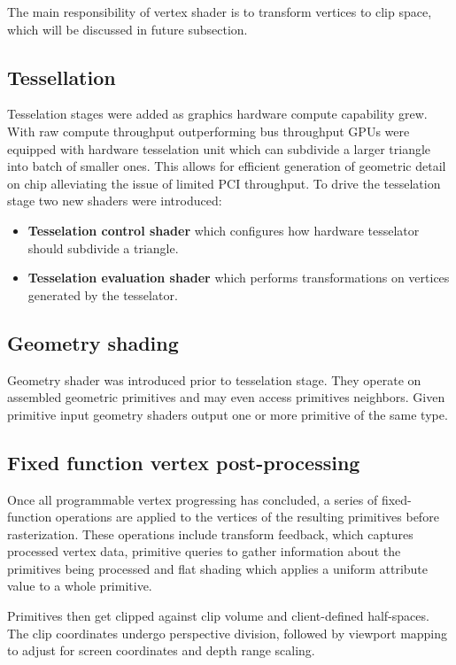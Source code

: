 The main responsibility of vertex shader is to transform vertices to clip space, which will be discussed in future subsection. %

\subsection{Tessellation}

Tesselation stages were added as graphics hardware compute capability grew. With raw compute throughput outperforming bus throughput GPUs were equipped with hardware
tesselation unit which can subdivide a larger triangle into batch of smaller ones. This allows for efficient generation of geometric detail on chip alleviating the 
issue of limited PCI throughput.
To drive the tesselation stage two new shaders were introduced:
\begin{itemize}
    \item \textbf{Tesselation control shader} which configures how hardware tesselator should subdivide a triangle.
    \item \textbf{Tesselation evaluation shader} which performs transformations on vertices generated by the tesselator.
\end{itemize}

\subsection{Geometry shading}

Geometry shader was introduced prior to tesselation stage. They operate on assembled geometric primitives and may even access primitives neighbors.
Given primitive input geometry shaders output one or more primitive of the same type.

\subsection{Fixed function vertex post-processing}

Once all programmable vertex progressing has concluded, a series of fixed-function operations are applied to the vertices of the resulting primitives before rasterization.
These operations include transform feedback, which captures processed vertex data, 
primitive queries to gather information about the primitives being processed 
and flat shading which applies a uniform attribute value to a whole primitive.

Primitives then get clipped against clip volume and client-defined half-spaces.
The clip coordinates undergo perspective division, followed by viewport mapping to adjust for screen coordinates and depth range scaling.


